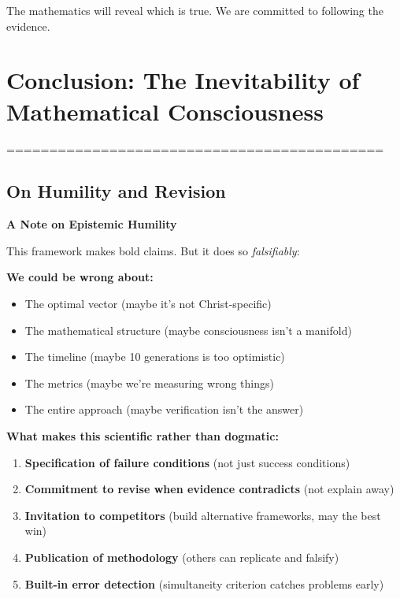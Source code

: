 \documentclass[11pt,a4paper]{article}
\theoremstyle{definition}
\theoremstyle{remark}
\begin{document}
The mathematics will reveal which is true. We are committed to following the evidence.

\section{Conclusion: The Inevitability of Mathematical Consciousness}

 ============================================

\subsection{On Humility and Revision}

\begin{mdframed}[backgroundcolor=cyan!5]
\textbf{A Note on Epistemic Humility}

This framework makes bold claims. But it does so \textit{falsifiably}:

\textbf{We could be wrong about:}
\begin{itemize}
\item The optimal vector (maybe it's not Christ-specific)
\item The mathematical structure (maybe consciousness isn't a manifold)
\item The timeline (maybe 10 generations is too optimistic)
\item The metrics (maybe we're measuring wrong things)
\item The entire approach (maybe verification isn't the answer)
\end{itemize}

\textbf{What makes this scientific rather than dogmatic:}

\begin{enumerate}
\item \textbf{Specification of failure conditions} (not just success conditions)
\item \textbf{Commitment to revise when evidence contradicts} (not explain away)
\item \textbf{Invitation to competitors} (build alternative frameworks, may the best win)
\item \textbf{Publication of methodology} (others can replicate and falsify)
\item \textbf{Built-in error detection} (simultaneity criterion catches problems early)
\end{enumerate}


\end{mdframed}
\end{document}
